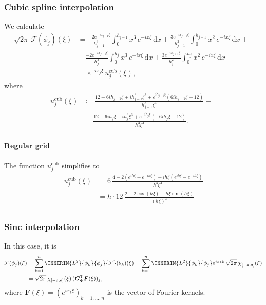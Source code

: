\documentclass[a4paper]{paper}
\newcommand*{\OP}[1]{{\ensuremath{\mathcal{#1}}}}
\newcommand*{\FT}{\OP{F}}
\DeclareMathOperator{\DEFEQ}{{\coloneqq}}
\newcommand*{\TRANSP}[1]{{\ensuremath{#1^{\mathrm{T}}}}}
\newcommand*{\I}{\ensuremath{\mathit{i}}}
\newcommand*{\D}{{\ensuremath{\mathrm{d}}}}
\newcommand*{\BDF}{\boldsymbol{F}}
\newcommand*{\BDG}{\boldsymbol{G}}
\begin{document}
\subsubsection{Cubic spline interpolation}
\label{subsubsec:specif:fourier:cubic}

We calculate
%
\begin{align*}
 \sqrt{2\pi}\, \FT(\phi_j)(\xi)
 &= \frac{-2 e^{-\I x_{j-1} \xi}}{h_{j-1}^3} \int_0^{h_{j-1}} x^3\, e^{-\I x\xi}\, \D x +
 \frac{3 e^{-\I x_{j-1} \xi}}{h_{j-1}^2} \int_0^{h_{j-1}} x^2\, e^{-\I x\xi}\, \D x + \phantom{x} \\
 &\hspace{12pt} \frac{-2 e^{-\I x_{j+1} \xi}}{h_j^3} \int_0^{h_j} x^3\, e^{-\I x\xi}\, \D x +
 \frac{3 e^{-\I x_{j+1} \xi}}{h_j^2} \int_0^{h_j} x^2\, e^{-\I x\xi}\, \D x \\
 &= e^{-\I x_j \xi}\, u_j^{\mathrm{cub}}(\xi),
\end{align*}
%
where
%
\begin{align*}
 u_j^{\mathrm{cub}}(\xi) &\DEFEQ 
 \frac{12 + 6\I h_{j-1}\xi + \I h_{j-1}^3\xi^3 + e^{\I h_{j-1}\xi} (6\I h_{j-1}\xi - 12)}{h_{j-1}^3 \xi^4} + 
 \phantom{x}\\
 &\hspace{15pt} 
 \frac{12 - 6\I h_j\xi - \I h_j^3\xi^3 + e^{-\I h_j\xi} (- 6\I h_j\xi - 12)}{h_j^3 \xi^4}.
\end{align*}

\paragraph{Regular grid} 

The function $u_j^{\mathrm{cub}}$ simplifies to
%
\begin{align*}
 u_j^{\mathrm{cub}}(\xi) 
 &= 6\, \frac{4 - 2(e^{\I h \xi} + e^{-\I h \xi}) + \I h \xi(e^{\I h \xi} - e^{-\I h \xi})}{h^3\xi^4} \\
 &= h\cdot 12\, \frac{2 - 2\cos(h\xi) - h \xi \sin(h\xi)}{(h\xi)^4} \\
\end{align*}

\subsubsection{Sinc interpolation}
\label{subsubsec:specif:fourier:sinc}

In this case, it is
%
\begin{align*}
 \FT(\phi_j)(\xi) 
 &= \sum_{k=1}^n \INNERIN{L^2}{\phi_k}{\phi_j} \FT(\theta_k)(\xi)
 = \sum_{k=1}^n \INNERIN{L^2}{\phi_k}{\phi_j} e^{\I x_k \xi}\, \sqrt{2\pi}\, \chi_{[-a,a]}(\xi)\\
 &= \sqrt{2\pi}\, \chi_{[-a,a]}(\xi)\, (\TRANSP{\BDG_\Phi} \BDF(\xi))_j,
\end{align*}
%
where $\BDF(\xi) = (e^{\I x_k \xi})_{k=1,\dots,n}$ is the vector of Fourier kernels.\\[1em]
\end{document}
